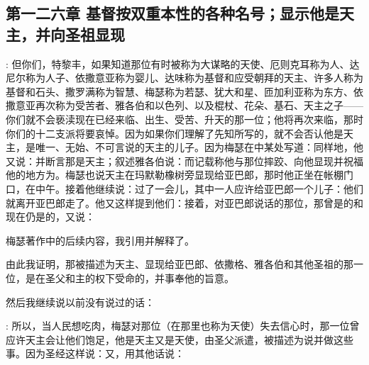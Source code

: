 
\subsection{第一二六章 基督按双重本性的各种名号；显示他是天主，并向圣祖显现}

: 但你们，特黎丰，如果知道那位有时被称为大谋略的天使、厄则克耳称为人、达尼尔称为人子、依撒意亚称为婴儿、达味称为基督和应受朝拜的天主、许多人称为基督和石头、撒罗满称为智慧、梅瑟称为若瑟、犹大和星、匝加利亚称为东方、依撒意亚再次称为受苦者、雅各伯和以色列、以及棍杖、花朵、基石、天主之子——你们就不会亵渎现在已经来临、出生、受苦、升天的那一位；他将再次来临，那时你们的十二支派将要哀悼。因为如果你们理解了先知所写的，就不会否认他是天主，是唯一、无始、不可言说的天主的儿子。因为梅瑟在中某处写道：同样地，他又说：并断言那是天主；叙述雅各伯说：而记载称他与那位摔跤、向他显现并祝福他的地方为。梅瑟也说天主在玛默勒橡树旁显现给亚巴郎，那时他正坐在帐棚门口，在中午。接着他继续说：\newline{}过了一会儿，其中一人应许给亚巴郎一个儿子：他们就离开亚巴郎走了。他又这样提到他们：\newline{}接着，对亚巴郎说话的那位，那曾是的和现在仍是的，又说：\par

梅瑟著作中的后续内容，我引用并解释了。\par

由此我证明，那被描述为天主、显现给亚巴郎、依撒格、雅各伯和其他圣祖的那一位，是在圣父和主的权下受命的，并事奉他的旨意。\par

然后我继续说以前没有说过的话：\par

: 所以，当人民想吃肉，梅瑟对那位（在那里也称为天使）失去信心时，那一位曾应许天主会让他们饱足，他是天主又是天使，由圣父派遣，被描述为说并做这些事。因为圣经这样说：\newline{}又，用其他话说：\par

